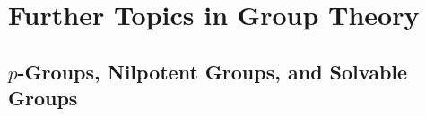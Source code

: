 \documentclass[../main]{subfiles}
\begin{document}
\section{Further Topics in Group Theory}


\subsection{$p$-Groups, Nilpotent Groups, and Solvable Groups}
















 
\end{document}
